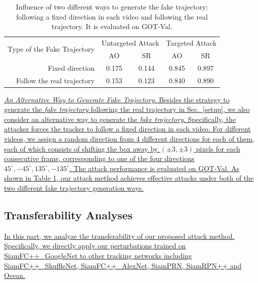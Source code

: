 \documentclass[journal]{IEEEtran}
\begin{document}
\begin{table}[t]
  \centering
  \caption{Influence of two different ways to generate the fake trajectory: following a fixed direction in each video and following the real trajectory. It is evaluated on GOT-Val.}
  \begin{tabular}{@{}rcccc@{}}
  \toprule
  \multirow{2}{*}[-2pt]{Type of the Fake Trajectory} & \multicolumn{2}{c}{Untargeted Attack} & \multicolumn{2}{c}{Targeted Attack} \\ \cmidrule{2-5}
                              & AO                & SR                & AO               & SR               \\ \midrule
  Fixed direction             & 0.175             & 0.144             & 0.845            & 0.897            \\
  Follow the real trajectory  & 0.153             & 0.123             & 0.840            & 0.890            \\ \bottomrule        
  \end{tabular}
  \vspace{-3mm}
  \label{table:direction}
\end{table}
\uline{\textit{An Alternative Way to Generate Fake Trajectory.} 
Besides the strategy to generate the \textit{fake trajectory} following the real trajectory in Sec.~\ref{setup}, we also consider an alternative way to generate the \textit{fake trajectory}.
Specifically, the attacker forces the tracker to follow a fixed direction in each video. For different videos, we assign a random direction from 4 different directions for each of them, each of which consists of shifting the box away by $(\pm 3, \pm 3)$ pixels for each consecutive frame, corresponding to one of the four directions $45^{\circ}, -45^{\circ}, 135^{\circ}, -135^{\circ}$.
The attack performance is evaluated on GOT-Val.
As shown in Table \ref{table:direction}, our attack method achieves effective attacks under both of the two different fake trajectory generation ways.}
\vspace{-3mm}

\subsection{Transferability Analyses}

\uline{In this part, we analyze the transferability of our proposed attack method. Specifically, we directly apply our perturbations trained on SiamFC++\_GoogleNet to other tracking networks including SiamFC++\_ShuffleNet, SiamFC++\_AlexNet, SiamPRN, SiamRPN++ and Ocean.}
\end{document}
